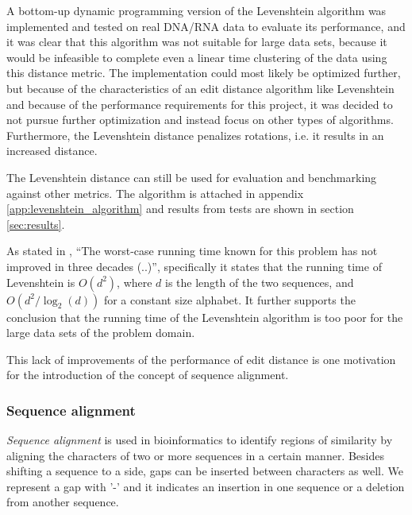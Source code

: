 A bottom-up dynamic programming version of the Levenshtein algorithm was
implemented and tested on real DNA/RNA data to evaluate its performance, and it
was clear that this algorithm was not suitable for large data sets, because it
would be infeasible to complete even a linear time clustering of the data using
this distance metric. The implementation could most likely be optimized
further, but because of the characteristics of an edit distance algorithm like
Levenshtein and because of the performance requirements for this project, it
was decided to not pursue further optimization and instead focus on other types
of algorithms. Furthermore, the Levenshtein distance penalizes rotations, i.e.
it results in an increased distance.

The Levenshtein distance can still be used for evaluation and benchmarking
against other metrics. The algorithm is attached in appendix
\ref{app:levenshtein_algorithm} and results from tests are shown in section
\ref{sec:results}.

As stated in \cite[pp.~1-2]{andoni}, ``The worst-case running time known for
this problem has not improved in three decades (..)'', specifically it states
that the running time of Levenshtein is $O(d^2)$, where $d$ is the length of
the two sequences, and $O(d^2/\log_2(d))$ for a constant size alphabet. It
further supports the conclusion that the running time of the Levenshtein
algorithm is too poor for the large data sets of the problem domain.

This lack of improvements of the performance of edit distance is one motivation
for the introduction of the concept of sequence alignment.



\subsubsection{Sequence alignment}

\emph{Sequence alignment} is used in bioinformatics to identify regions of
similarity by aligning the characters of two or more sequences in a certain
manner. Besides shifting a sequence to a side, gaps can be inserted between
characters as well. We represent a gap with '-' and it indicates an insertion
in one sequence or a deletion from another sequence.~\cite[pp.~135-136]{dong}

